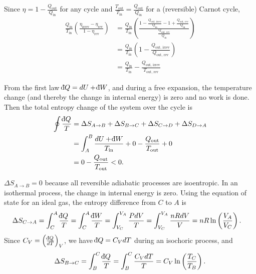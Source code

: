 \documentclass[a4paper,12pt]{article}
\def\dbar{{\mathchar'26\mkern-12mu \mathrm{d}}}
\begin{document}
\begin{enumerate}[label=\textbf{[\arabic*]}]
    \item
        Since $\eta = 1 - \frac{Q_\text{out}}{Q_\text{in}}$ for any cycle and $\frac{T_\text{out}}{T_\text{in}} = \frac{Q_\text{out}}{Q_\text{in}}$ for a (reversible) Carnot cycle,
        \begin{align*}
            \frac{Q_\text{in}}{T_\text{in}} \left( \frac{\eta_\text{irrev} - \eta_\text{rev}}{1 - \eta_\text{rev}} \right) &= \frac{Q_\text{in}}{T_\text{in}} \left( \frac{1 - \frac{Q_\text{out, irrev}}{Q_\text{in}} - 1 + \frac{Q_\text{out, rev}}{Q_\text{in}}}{\frac{Q_\text{out, rev}}{Q_\text{in}}} \right) \\
            &= \frac{Q_\text{in}}{T_\text{in}} \left( 1 - \frac{Q_\text{out, irrev}}{Q_\text{out, rev}} \right) \\
            &= \frac{Q_\text{in}}{T_\text{in}} - \frac{Q_\text{out, irrev}}{T_\text{out, rev}}
        \end{align*}

    \item
        From the first law $\dbar Q = dU + \dbar W$, and during a free expansion, the temperature change (and thereby the change in internal energy) is zero and no work is done. Then the total entropy change of the system over the cycle is
        \begin{align*}
            \oint \frac{\dbar Q}{T} &= \Delta S_{A \to B} + \Delta S_{B \to C} + \Delta S_{C \to D} + \Delta S_{D \to A} \\
            &= \int_{A}^{B} \frac{dU + \dbar W}{T_\text{in}} + 0 - \frac{Q_\text{out}}{T_\text{out}} + 0 \\
            &= 0 - \frac{Q_\text{out}}{T_\text{out}} < 0.
        \end{align*}

    \item
        $\Delta S_{A \to B} = 0$ because all reversible adiabatic processes are isoentropic. In an isothermal process, the change in internal energy is zero. Using the equation of state for an ideal gas, the entropy difference from $C$ to $A$ is
        \begin{align*}
            \Delta S_{C \to A} = \int_C^A \frac{\dbar Q}{T} &= \int_C^A \frac{\dbar W}{T} = \int_{V_C}^{V_A} \frac{P dV}{T} = \int_{V_C}^{V_A} \frac{nRdV}{V} = nR \ln \left( \frac{V_A}{V_C} \right).
        \end{align*}
        Since $C_V = \left( \frac{\dbar Q}{dT} \right)_V$, we have $\dbar Q = C_V dT$ during an isochoric process, and
        \begin{align*}
            \Delta S_{B \to C} = \int_B^C \frac{\dbar Q}{T} = \int_B^C \frac{C_V dT}{T} = C_V \ln \left( \frac{T_C}{T_B} \right).
        \end{align*}


\end{enumerate}
\end{document}
